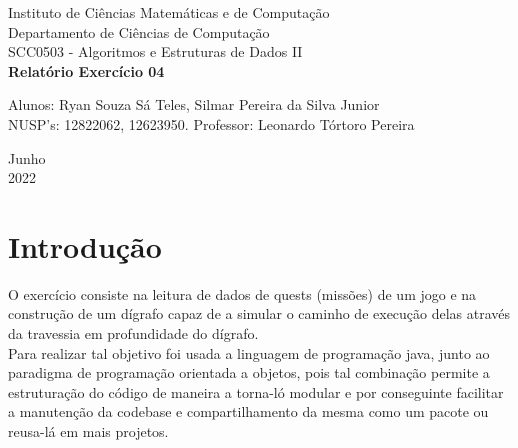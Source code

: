 \documentclass[a4paper, 12pt]{article}
\begin{document}

\begin{titlepage}
	\begin{center}
	

		\Huge{Instituto de Ciências Matemáticas e de Computação}\\
		\large{Departamento de Ciências de Computação}\\ 
		\large{SCC0503 - Algoritmos e Estruturas de Dados II}\\ 
		\vspace{15pt}
        \vspace{95pt}
        \textbf{\LARGE{Relatório Exercício 04}}\\
		\vspace{3,5cm}
	\end{center}
	
	\begin{flushleft}
		\begin{tabbing}
			Alunos: Ryan Souza Sá Teles, Silmar Pereira da Silva Junior \\
            NUSP's: 12822062, 12623950.
			Professor: Leonardo Tórtoro Pereira\\
	\end{tabbing}
 \end{flushleft}
	\vspace{1cm}
	
	\begin{center}
		\vspace{\fill}
			 Junho\\
		 2022
			\end{center}
\end{titlepage}

\newpage
\newpage
\tableofcontents
\thispagestyle{empty}

\newpage
{}
\section{Introdução}
O exercício consiste na leitura de dados de quests (missões) de um jogo e na construção de um dígrafo capaz de a simular o caminho de execução delas através da travessia em profundidade do dígrafo.\\
Para realizar tal objetivo foi usada a linguagem de programação java, junto ao paradigma de programação orientada a objetos, pois tal combinação permite a estruturação do código de maneira a torna-ló modular e por conseguinte facilitar a manutenção da codebase e compartilhamento da mesma como um pacote ou reusa-lá em mais projetos.\\
\end{document}

